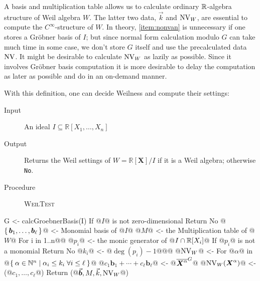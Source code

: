 \documentclass[%
  sigconf,authorversion,screen]{acmart}
\begin{document}
A basis and multiplication table allows us to calculate ordinary $\mathbb{R}$-algebra structure of Weil algebra $W$.
The latter two data, $\vec{k}$ and $\operatorname{NV}_W$, are essential to compute the $C^\infty$-structure of $W$.
In theory, \ref{item:nonvan} is unnecessary if one stores a Gr\"{o}bner basis of $I$;
but since normal form calculation modulo $G$ can take much time in some case, we don't store $G$ itself and use the precalculated data $\operatorname{NV}$.
It might be desirable to calculate $\operatorname{NV}_W$ as lazily as possible.
Since it involves Gr\"{o}bner basis computation it is more desirable to delay the computation as later as possible and do in an on-demand manner.

With this definition, one can decide Weilness and compute their settings:

\begin{algorithm}\label{alg:weil-test}
  \hspace{1em}\vspace{-.25em}
  \begin{description}
    \item[Input] An ideal $I \subseteq \mathbb{R}[X_1, \dots, X_n]$
    \item[Output] Returns the Weil settings of $W = \mathbb{R}[\boldsymbol{X}]/I$ if it is a Weil algebra; otherwise \verb|No|.
    \item[Procedure] \textup{\textsc{WeilTest}}
  \end{description}

  \begin{alg}
G <- calcGroebnerBasis(I)
If @$I$@ is not zero-dimensional
  Return No
@$\set{\boldsymbol{b}_1, \dots, \boldsymbol{b}_\ell}$@ <- Monomial basis of @$I$@
@$M$@ <- the Multiplication table of @$W$@
For i in 1..n@\label{line:weil-test:radical-start}@
  @$p_i$@ <- the monic generator of @$I \cap \mathbb{R}[X_i]$@
  If @$p_i$@ is not a monomial
    Return No
  @$k_i$@ <- @$\deg(p_i) - 1$@@\label{line:weil-test:radical-end}@
@$\operatorname{NV}_W$@ <- {}
For @$\alpha$@ in @$\Set{\alpha \in \mathbb{N}^n | \alpha_i \leq k_i \; \forall i \leq \ell}$@
  @$c_1 \boldsymbol{b}_1 + \cdots + c_\ell \boldsymbol{b}_\ell$@ <- @${\overline{\boldsymbol{X}^\alpha}}^{G}$@
  @$\operatorname{NV}_W(\boldsymbol{X}^\alpha)$@ <- (@$c_1, \dots, c_\ell$@)
Return (@$\vec{\boldsymbol{b}}, M, \vec{k}, \operatorname{NV}_W$@)
\end{alg}
\end{algorithm}
\end{document}
